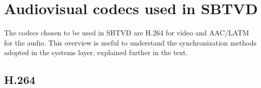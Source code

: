 \documentclass[
	12pt,				%
	openright,			%
	twoside,			%
	a4paper,			%
	brazil,
	french,				%
	english
	]{abntex2}
\begin{document}




%



\chapter{Audiovisual codecs used in SBTVD}
\label{codecs}

The codecs chosen to be used in SBTVD are H.264 for video and AAC/LATM for the audio. This overview is useful to understand the synchronization methods adopted in the systems layer, explained further in the text.

\section{H.264}
\end{document}
